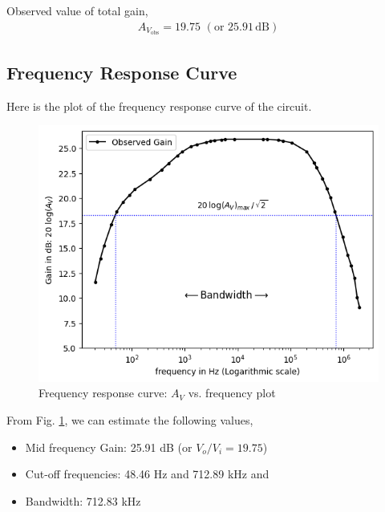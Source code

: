 Observed value of total gain,
\begin{align*}
    A_{V_\text{obs}} = 19.75\,\,(\text{or }25.91\,\text{dB})
\end{align*}

\subsection*{Frequency Response Curve}

Here is the plot of the frequency response curve of the circuit.
\begin{figure}[H]
    \centering
    \includegraphics[width=1\columnwidth]{images/g1.png}
    \caption{Frequency response curve: $A_V$ vs. frequency plot}
    \label{graph}
\end{figure}

From Fig. \ref{graph}, we can estimate the following values,

\begin{itemize}
    \item Mid frequency Gain: 25.91 dB (or $V_o/V_i=19.75$)
    \item Cut-off frequencies: 48.46 Hz and 712.89 kHz and 
    \item Bandwidth: 712.83 kHz\\
\end{itemize}